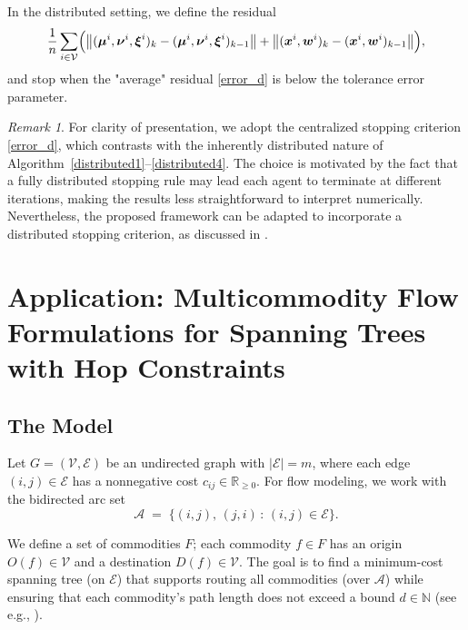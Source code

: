 \documentclass[11pt,a4paper]{article}
\theoremstyle{plain}
\theoremstyle{definition}
\theoremstyle{remark}
\newtheorem{remark}[theorem]{Remark}
\begin{document}
	In the distributed setting, we define the residual
	\begin{equation}
		\frac{1}{n}\sum_{i\in\mathcal{V}}
		\Bigl(
		\bigl\|(\boldsymbol{\mu}^i,\boldsymbol{\nu}^i,\boldsymbol{\xi}^i)_{k}-(\boldsymbol{\mu}^i,\boldsymbol{\nu}^i,\boldsymbol{\xi}^i)_{k-1}\bigr\|
		+
		\bigl\|(\boldsymbol{x}^i,\boldsymbol{w}^i)_{k}-(\boldsymbol{x}^i,\boldsymbol{w}^i)_{k-1}\bigr\|
		\Bigr),
		\label{error_d}
	\end{equation}
	and stop when the "average" residual \eqref{error_d} is below the tolerance error parameter.
	
	
	\begin{remark}
		For clarity of presentation, we adopt the centralized stopping criterion 
		\eqref{error_d}, which contrasts with the inherently distributed nature of 
		Algorithm~\eqref{distributed1}--\eqref{distributed4}. The choice is motivated by the 
		fact that a fully distributed stopping rule may lead each agent to terminate 
		at different iterations, making the results less straightforward to interpret numerically. 
		Nevertheless, the proposed framework can be adapted to incorporate a distributed 
		stopping criterion, as discussed in \cite{asefi2020distributed}.
	\end{remark}
	
	
	\section{Application: Multicommodity Flow Formulations for Spanning Trees with Hop Constraints}
	
	\subsection{The Model}
	Let \(G=(\mathcal{V},\mathcal{E})\) be an undirected graph with $|\mathcal{E}|=m$, where each edge \((i,j)\in\mathcal{E}\) has a nonnegative cost \(c_{ij}\in\mathbb{R}_{\ge 0}\).
	For flow modeling, we work with the bidirected arc set
	\[
	\mathcal{A} \;=\; \{(i,j),\,(j,i)\,:\,(i,j)\in\mathcal{E}\}.
	\]
	
	We define a set of commodities \(F\); each commodity \(f\in F\) has an origin \(O(f)\in\mathcal{V}\) and a destination \(D(f)\in\mathcal{V}\).
	The goal is to find a minimum-cost spanning tree (on \(\mathcal{E}\)) that supports routing all commodities (over \(\mathcal{A}\)) while ensuring that each commodity’s path length does not exceed a bound \(d\in\mathbb{N}\)
	(see e.g., \cite{gouveia1996multicommodity,gouveia2003network,dahl2006formulations,magnanti1981combinatorial}).
	
\end{document}
